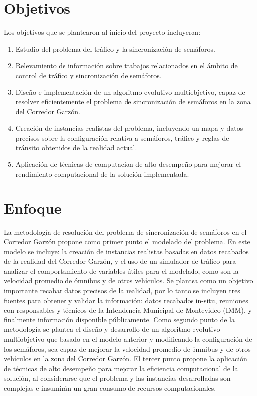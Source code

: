 \section{Objetivos}

Los objetivos que se plantearon al inicio del proyecto incluyeron:

\begin{enumerate}
	\item Estudio del problema del tráfico y la sincronización de semáforos.
	\item Relevamiento de información sobre trabajos relacionados en el ámbito de control de tráfico y sincronización de semáforos.
	\item Diseño e implementación de un algoritmo evolutivo multiobjetivo, capaz de resolver eficientemente el problema de sincronización de semáforos en la zona del Corredor Garzón.
	\item Creación de instancias realistas del problema, incluyendo un mapa y datos precisos sobre la configuración relativa a semáforos, tráfico y reglas de tránsito obtenidos de la realidad actual.	
	\item Aplicación de técnicas de computación de alto desempeño para mejorar el rendimiento computacional de la solución implementada.

\end{enumerate}

 
\section{Enfoque}

La metodología de resolución del problema de sincronización de semáforos en el Corredor Garzón propone como primer punto el modelado del problema. En este modelo se incluye: la creación de instancias realistas basadas en datos recabados de la realidad del Corredor Garzón, y el uso de un simulador de tráfico para analizar el comportamiento de variables útiles para el modelado, como son la velocidad promedio de ómnibus y de otros vehículos. Se plantea como un objetivo importante recabar datos precisos de la realidad, por lo tanto se incluyen tres fuentes para obtener y validar la información: datos recabados in-situ, reuniones con responsables y técnicos de la Intendencia Municipal de Montevideo (IMM), y finalmente información disponible públicamente.
Como segundo punto de la metodología se plantea el diseño y desarrollo de un algoritmo evolutivo multiobjetivo que basado en el modelo anterior y modificando la configuración de los semáforos, sea capaz de mejorar la velocidad promedio de ómnibus y de otros vehículos en la zona del Corredor Garzón. El tercer punto propone la aplicación de técnicas de alto desempeño para mejorar la eficiencia computacional de la solución, al considerarse que el problema y las instancias desarrolladas son complejas e insumirán un gran consumo de recursos computacionales. 




